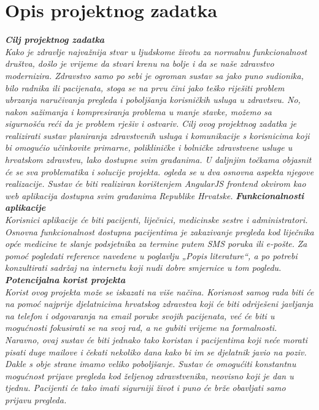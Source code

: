 \chapter{Opis projektnog zadatka}
		
		\textbf{\textit{Cilj projektnog zadatka}}\\
		
		\textit{Kako je zdravlje najvažnija stvar u ljudskome životu za normalnu funkcionalnost društva, došlo je vrijeme da stvari krenu na bolje i da se naše zdravstvo modernizira. Zdravstvo samo po sebi je ogroman sustav sa jako puno sudionika, bilo radnika ili pacijenata, stoga se na prvu čini jako teško riješiti problem ubrzanja naručivanja pregleda i poboljšanja korisničkih usluga u zdravtsvu. No, nakon sažimanja i kompresiranja problema u manje stavke, možemo sa sigurnošću reći da je problem rješiv i ostvariv. Cilj ovog projektnog zadatka je realizirati sustav planiranja zdravstvenih usluga i komunikacije s 
korisnicima koji bi omogućio učinkovite primarne, polikliničke i bolničke zdravstvene usluge u hrvatskom zdravstvu, lako dostupne svim građanima. U daljnjim točkama objasnit će se sva problematika i solucije projekta.
ogleda se u dva osnovna aspekta njegove realizacije. Sustav će biti realiziran korištenjem AngularJS frontend okvirom kao web aplikacija dostupna svim građanima Republike Hrvatske.  } \newline \newline
                \textbf{\textit{Funkcionalnosti aplikacije}}\\
            \newline
            \textit{}
            \textit{
            Korisnici aplikacije će biti pacijenti, liječnici, medicinske sestre i administratori. Osnovna funkcionalnost dostupna pacijentima je zakazivanje pregleda kod 
liječnika opće medicine te slanje podsjetnika za termine putem SMS poruka ili 
e-pošte. }	
		\textit{Za pomoć pogledati reference navedene u poglavlju „Popis literature“, a po potrebi konzultirati sadržaj na internetu koji nudi dobre smjernice u tom pogledu.}
       \newline
       \newline
            \textbf{\textit{Potencijalna korist projekta}}\\ 
            \newline
            \textit{Korist ovog projekta može se iskazati na više načina. Korisnost samog rada biti će na pomoć najprije djelatnicima hrvatskog zdravstva koji će biti odriješeni javljanja na telefon i odgovaranja na email poruke svojih pacijenata, već će biti u mogućnosti fokusirati se na svoj rad, a ne gubiti vrijeme na formalnosti. Naravno, ovaj sustav će biti jednako tako koristan i pacijentima koji neće morati pisati duge mailove i čekati nekoliko dana kako bi im se djelatnik javio na poziv. Dakle s obje strane imamo veliko poboljšanje. Sustav će omogućiti konstantnu mogućnost prijave pregleda kod željenog zdravstvenika, neovisno koji je dan u tjednu. Pacijenti će tako imati sigurniji život i puno će brže obavljati samo prijavu pregleda. }
